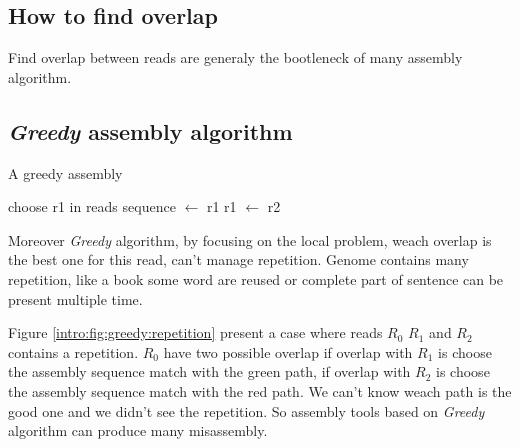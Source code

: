 \documentclass[./main.tex]{subfiles}
\begin{document}
\subsection{How to find overlap}

Find overlap between reads are generaly the bootleneck of many assembly algorithm. 

\subsection{\textit{Greedy} assembly algorithm}


\begin{algorithm}[ht]
    \caption{A greedy assembly}
    \begin{algorithmic}[1]
        \State choose r1 in reads
        \State sequence $\leftarrow$ r1
            \State {}
            \State {}
            \State r1 $\leftarrow$ r2
        \EndWhile
    \EndFunction
    \end{algorithmic}
    \label{intro:algo:greedy}
\end{algorithm}

Moreover \textit{Greedy} algorithm, by focusing on the local problem, weach overlap is the best one for this read, can't manage repetition. Genome contains many repetition, like a book some word are reused or complete part of sentence can be present multiple time.

Figure \ref{intro:fig:greedy:repetition} present a case where reads $R_0$ $R_1$ and $R_2$ contains a repetition. $R_0$ have two possible overlap if overlap with $R_1$ is choose the assembly sequence match with the green path, if overlap with $R_2$ is choose the assembly sequence match with the red path. We can't know weach path is the good one and we didn't see the repetition. So assembly tools based on \textit{Greedy} algorithm can produce many misassembly.
\end{document}
